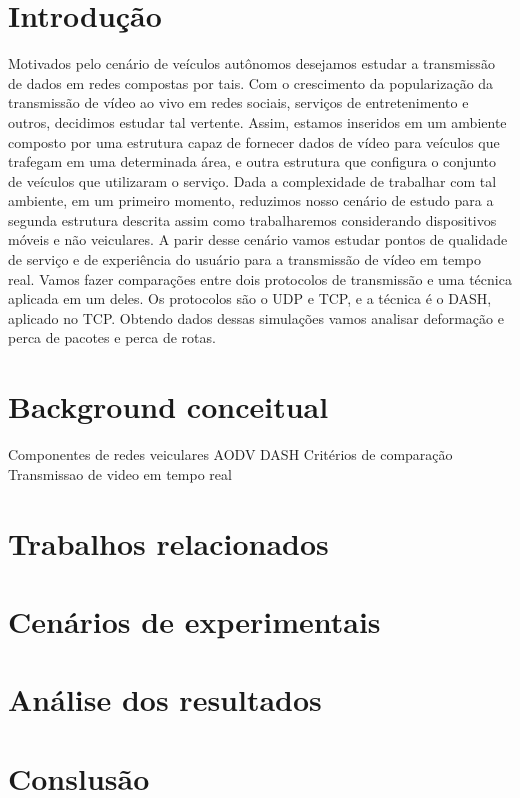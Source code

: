 \documentclass[12pt]{article}
\begin{document}
\section{Introdução} \label{sec:introducao}
	
    Motivados pelo cenário de veículos autônomos desejamos estudar a transmissão de dados em redes compostas por tais. Com o crescimento da popularização da transmissão de vídeo ao vivo em redes sociais, serviços de entretenimento e outros, decidimos estudar tal vertente. Assim, estamos inseridos em um ambiente composto por uma estrutura capaz de fornecer dados de vídeo para veículos que trafegam em uma determinada área, e outra estrutura que configura o conjunto de veículos que utilizaram o serviço.
    Dada a complexidade de trabalhar com tal ambiente, em um primeiro momento, reduzimos nosso cenário de estudo para a segunda estrutura descrita assim como trabalharemos considerando dispositivos móveis e não veiculares.
    A parir desse cenário vamos estudar pontos de qualidade de serviço e de experiência do usuário para a transmissão de vídeo em tempo real. Vamos fazer comparações entre dois protocolos de transmissão e uma técnica aplicada em um deles. Os protocolos são o UDP e TCP, e a técnica é o DASH, aplicado no TCP. Obtendo dados dessas simulações vamos analisar deformação e perca de pacotes e perca de rotas.
    
\section{Background conceitual} \label{sec:conceitual}
	Componentes de redes veiculares
    AODV
    DASH
    Critérios de comparação
    Transmissao de video em tempo real

\section{Trabalhos relacionados} \label{sec:trabalhos}
\section{Cenários de experimentais} \label{sec:cenariosexp}
\section{Análise dos resultados} \label{sec:analise}
\section{Conslusão} \label{sec:conclusao}
\end{document}

